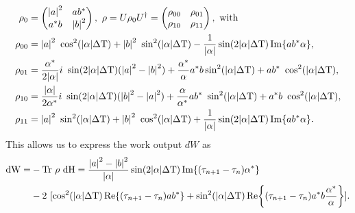 \begin{align}
	\rho_0 & = \begin{pmatrix}
	\abs{a}^2 & a b ^* \\
	a^* b & \abs{b}^2 \\
	\end{pmatrix}, \ \rho = U \rho_0 U^\dagger = 
	\begin{pmatrix}
	\rho_{00} & \rho_{01} \\
	\rho_{10} & \rho_{11} \\
	\end{pmatrix},  \ \text{with} \nonumber \\
	\rho_{00} & = \abs{a}^2 \ \cos^2(\abs{\alpha} \Delta \mathrm{T}) + \abs{b}^2 \ \sin^2(\abs{\alpha} \Delta \mathrm{T}) - \frac{1}{\abs{\alpha}} \sin(2 \abs{\alpha} \Delta \mathrm{T}) \Im{a b^* \alpha}, \nonumber \\
	\rho_{01} & = \frac{\alpha^*}{2 \abs{\alpha}} i \ \sin(2 \abs{\alpha} \Delta \mathrm{T}) (\abs{a}^2 - \abs{b}^2) + \frac{\alpha^*}{\alpha} a^* b \sin^2(\abs{\alpha} \Delta \mathrm{T}) + a b^* \ \cos^2(\abs{\alpha} \Delta \mathrm{T}), \nonumber \\
	\rho_{10} & = 	\frac{\abs{\alpha}}{2 \alpha^*} i \ \sin(2 \abs{\alpha} \Delta \mathrm{T}) (\abs{b}^2 - \abs{a}^2) + \frac{\alpha}{\alpha^*} a b^* \ \sin^2(\abs{\alpha} \Delta \mathrm{T}) + a^* b \ \cos^2(\abs{\alpha} \Delta \mathrm{T}), \nonumber \\
	\rho_{11} & = \abs{a}^2 \ \sin^2(\abs{\alpha} \Delta \mathrm{T}) + \abs{b}^2 \ \cos^2(\abs{\alpha} \Delta \mathrm{T}) + \frac{1}{\abs{\alpha}} \sin(2 \abs{\alpha} \Delta \mathrm{T}) \Im{a b^* \alpha}. \nonumber
\end{align}
	This allows us to express the work output $dW$ as
\begin{align}
	\mathrm{dW} = & - \mathrm{Tr} \ \rho \ \mathrm{dH} = \frac{\abs{a}^2 - \abs{b}^2}{\abs{\alpha}} \sin(2 \abs{\alpha} \Delta \mathrm{T}) \Im{(\tau_{n+1} - \tau_n) \alpha^*} \nonumber \\
	& - 2 \ [\cos^2(\abs{\alpha} \Delta \mathrm{T}) \Re{(\tau_{n+1} - \tau_n) a b^*} 
	+ \sin^2(\abs{\alpha} \Delta \mathrm{T}) \Re{(\tau_{n+1} - \tau_n)a^* b \frac{\alpha^*}{\alpha}} ]. \label{dwformula}
\end{align}